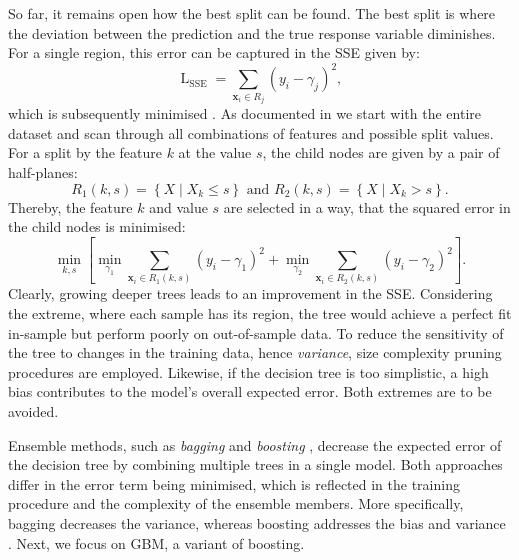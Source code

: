 So far, it remains open how the best split can be found. The best split is where the deviation between the prediction and the true response variable diminishes. For a single region, this error can be captured in the \gls{SSE} given by:
\begin{equation}
    \operatorname{L}_{\mathrm{SSE}} =\sum_{\mathbf{x}_{i} \in R_j}\left(y_{i}-\gamma_{j}\right)^{2},
\end{equation}
which is subsequently minimised \autocite[][231]{breimanClassificationRegressionTrees2017}. As documented in \textcite[][326]{hastietrevorElementsStatisticalLearning2009} we start with the entire dataset and scan through all combinations of features and possible split values. For a split by the feature $k$ at the value $s$, the child nodes are given by a pair of half-planes:
\begin{equation}
    R_1(k, s)=\left\{X \mid X_k \leq s\right\} \text { and } R_2(k, s)=\left\{X \mid X_k>s\right\}.
\end{equation}
Thereby, the feature $k$ and value $s$ are selected in a way, that the squared error in the child nodes is minimised:
\begin{equation}
    \min _{k, s}\left[\min _{\gamma_1} \sum_{\mathbf{x}_i \in R_1(k, s)}\left(y_i-\gamma_1\right)^2+\min _{\gamma_2} \sum_{\mathbf{x}_i \in R_2(k, s)}\left(y_i-\gamma_2\right)^2\right].
\end{equation}
Clearly, growing deeper trees leads to an improvement in the \gls{SSE}. Considering the extreme, where each sample has its region, the tree would achieve a perfect fit in-sample but perform poorly on out-of-sample data. To reduce the sensitivity of the tree to changes in the training data, hence \emph{variance}, size complexity pruning procedures are employed. Likewise, if the decision tree is too simplistic, a high bias contributes to the model's overall expected error. Both extremes are to be avoided.

Ensemble methods, such as \emph{bagging} \autocite[][123]{breimanBaggingPredictors1996} and \emph{boosting} \autocite[][197--227]{schapireStrengthWeakLearnability1990}, decrease the expected error of the decision tree by combining multiple trees in a single model. Both approaches differ in the error term being minimised, which is reflected in the training procedure and the complexity of the ensemble members. More specifically, bagging decreases the variance, whereas boosting addresses the bias and variance \autocites[][1672]{schapireBoostingMarginNew1998}[][29]{breimanRandomForests2001}. Next, we focus on \gls{GBM}, a variant of boosting.

